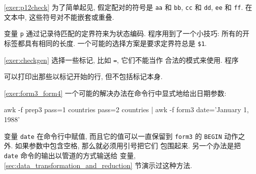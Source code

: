 \myexer\ref{exer:p12check} 为了简单起见, 假定配对的符号是 \texttt{aa} 和
\texttt{bb}, \texttt{cc} 和 \texttt{dd}, \texttt{ee} 和 \texttt{ff}.
在文本中, 这些符号对不能嵌套或重叠.
变量 \texttt{p} 通过记录待匹配的定界符来为状态编码. 程序用到了一个小技巧:
所有的开标签都具有相同的长度. 一个可能的选择方案是要求定界符总是 \verb'$1'.

\myexer\ref{exer:checkgen} 选择一些标记, 比如 \texttt{=}, 它们不能当作
合法的模式来使用. 程序 
可以打印出那些以标记开始的行, 但不包括标记本身.

\myexer\ref{exer:form3_form4} 一个可能的解决办法在命令行中显式地给出日期参数:
\begin{shell}
    awk -f prep3 pass=1 countries pass=2 countries |
        awk -f form3 date='January 1, 1988'
\end{shell}
变量 \texttt{date} 在命令行中赋值, 而且它的值可以一直保留到 \texttt{form3}
的 \texttt{BEGIN} 动作之外. 如果参数中包含空格, 那么就必须用引号把它们
包围起来. 另一个办法是把 \texttt{date} 命令的输出以管道的方式输送给 
变量, \ref{sec:data_transformation_and_reduction} 节演示过这种方法.

